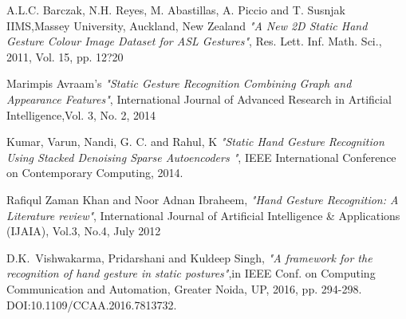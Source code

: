 \documentclass[conference]{IEEEtran}
\begin{document}
\begin{thebibliography}{1}
A.L.C. Barczak, N.H. Reyes, M. Abastillas, A. Piccio and T. Susnjak IIMS,Massey University, Auckland, New Zealand  \emph{"A New 2D Static Hand Gesture Colour Image Dataset for ASL Gestures"}, Res. Lett. Inf. Math. Sci., 2011, Vol. 15, pp. 12?20

Marimpis Avraam’s  \emph{"Static Gesture Recognition Combining Graph and Appearance Features"}, International Journal of Advanced Research in Artificial Intelligence,Vol. 3, No. 2, 2014


Kumar, Varun, Nandi, G. C. and Rahul, K \emph{"Static Hand Gesture
Recognition Using Stacked Denoising Sparse Autoencoders
"}, IEEE International Conference on Contemporary Computing, 2014.


Rafiqul Zaman Khan and Noor Adnan Ibraheem, \emph{"Hand Gesture Recognition:   A Literature review"}, International Journal of Artificial Intelligence \& Applications (IJAIA), Vol.3, No.4, July 2012


D.K.~Vishwakarma, Pridarshani and  Kuldeep Singh,  \emph{"A framework for the recognition of hand gesture in static postures"},in IEEE Conf. on Computing Communication and Automation, Greater Noida, UP, 2016, pp. 294-298. DOI:10.1109/CCAA.2016.7813732.




\end{thebibliography}




\end{document}

